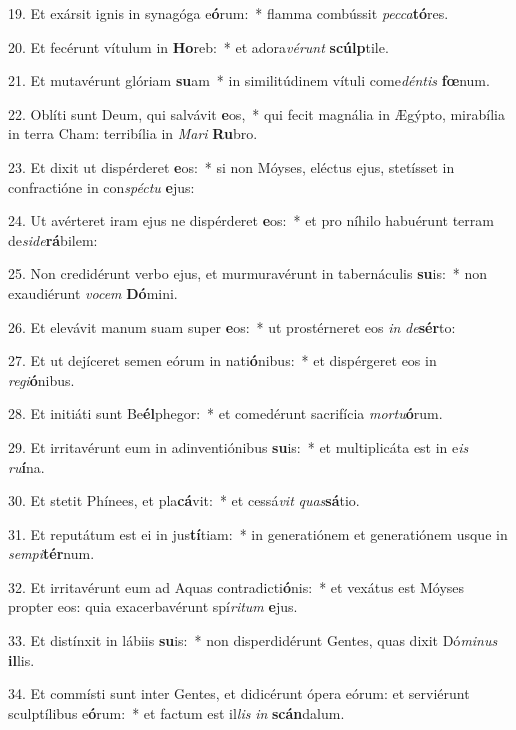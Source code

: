 19. Et exársit ignis in synagóga e\textbf{ó}rum:~*  flamma combússit \textit{pec}\textit{ca}\textbf{tó}res.\

20. Et fecérunt vítulum in \textbf{Ho}reb:~*  et adora\textit{vé}\textit{runt} \textbf{scúlp}tile.\

21. Et mutavérunt glóriam \textbf{su}am~*  in similitúdinem vítuli come\textit{dén}\textit{tis} \textbf{fœ}num.\

22. Oblíti sunt Deum, qui salvávit \textbf{e}os,~*  qui fecit magnália in Ægýpto, mirabília in terra Cham: terribília in \textit{Ma}\textit{ri} \textbf{Ru}bro.\

23. Et dixit ut dispérderet \textbf{e}os:~*  si non Móyses, eléctus ejus, stetísset in confractióne in con\textit{spéc}\textit{tu} \textbf{e}jus:\

24. Ut avérteret iram ejus ne dispérderet \textbf{e}os:~*  et pro níhilo habuérunt terram de\textit{si}\textit{de}\textbf{rá}bilem:\

25. Non credidérunt verbo ejus, et murmuravérunt in tabernáculis \textbf{su}is:~*  non exaudiérunt \textit{vo}\textit{cem} \textbf{Dó}mini.\

26. Et elevávit manum suam super \textbf{e}os:~*  ut prostérneret eos \textit{in} \textit{de}\textbf{sér}to:\

27. Et ut dejíceret semen eórum in nati\textbf{ó}nibus:~*  et dispérgeret eos in \textit{re}\textit{gi}\textbf{ó}nibus.\

28. Et initiáti sunt Be\textbf{él}phegor:~*  et comedérunt sacrifícia \textit{mor}\textit{tu}\textbf{ó}rum.\

29. Et irritavérunt eum in adinventiónibus \textbf{su}is:~*  et multiplicáta est in e\textit{is} \textit{ru}\textbf{í}na.\

30. Et stetit Phínees, et pla\textbf{cá}vit:~*  et cessá\textit{vit} \textit{quas}\textbf{sá}tio.\

31. Et reputátum est ei in jus\textbf{tí}tiam:~*  in generatiónem et generatiónem usque in \textit{sem}\textit{pi}\textbf{tér}num.\

32. Et irritavérunt eum ad Aquas contradicti\textbf{ó}nis:~*  et vexátus est Móyses propter eos: quia exacerbavérunt spí\textit{ri}\textit{tum} \textbf{e}jus.\

33. Et distínxit in lábiis \textbf{su}is:~*  non disperdidérunt Gentes, quas dixit Dó\textit{mi}\textit{nus} \textbf{il}lis.\

34. Et commísti sunt inter Gentes, et didicérunt ópera eórum: et serviérunt sculptílibus e\textbf{ó}rum:~*  et factum est il\textit{lis} \textit{in} \textbf{scán}dalum.\

